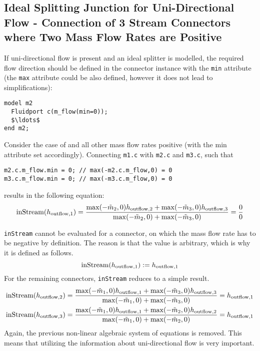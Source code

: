 \subsection{Ideal Splitting Junction for Uni-Directional Flow - Connection of 3 Stream Connectors where Two Mass Flow Rates are Positive}\label{connection-of-3-stream-connectors-where-two-mass-flow-rates-are-positive-ideal-splitting-junction-for-uni-directional-flow}\label{ideal-splitting-junction-for-uni-directional-flow-connection-of-3-stream-connectors-where-two-mass-flow-rates-are-positive}

If uni-directional flow is present and an ideal splitter is modelled, the required flow direction should be defined in the connector instance with the \lstinline!min! attribute (the \lstinline!max! attribute could be also defined, however it does not lead to simplifications):
\begin{lstlisting}[language=modelica]
model m2
  Fluidport c(m_flow(min=0));
  $\ldots$
end m2;
\end{lstlisting}

Consider the case of and all other mass flow rates positive (with the min attribute set accordingly).
Connecting \lstinline!m1.c! with \lstinline!m2.c! and \lstinline!m3.c!, such that
\begin{lstlisting}[language=modelica]
m2.c.m_flow.min = 0; // max(-m2.c.m_flow,0) = 0
m3.c.m_flow.min = 0; // max(-m3.c.m_flow,0) = 0
\end{lstlisting}
results in the following equation:
\begin{equation*}
\text{\lstinline!inStream!}(h_{\mathrm{outflow},1})=\frac{\operatorname{max}(-\tilde{m}_2,0)h_{\mathrm{outflow},2}+\operatorname{max}(-\tilde{m}_3,0)h_{\mathrm{outflow},3}}{\operatorname{max}(-\tilde{m}_2,0)+\operatorname{max}(-\tilde{m}_3,0)}=\frac{0}{0}
\end{equation*}

\lstinline!inStream! cannot be evaluated for a connector, on which the mass flow rate has to be negative by definition.
The reason is that the value is arbitrary, which is why it is defined as follows.
\begin{equation*}
\text{\lstinline!inStream!}(h_{\mathrm{outflow},1}):=h_{\mathrm{outflow},1}
\end{equation*}
For the remaining connectors, \lstinline!inStream! reduces to a simple result.
\begin{align*}
\text{\lstinline!inStream!}(h_{\mathrm{outflow},2}) &= \frac{\operatorname{max}(-\tilde{m}_1,0)h_{\mathrm{outflow},1}+\operatorname{max}(-\tilde{m}_3,0)h_{\mathrm{outflow},3}}{\operatorname{max}(-\tilde{m}_1,0)+\operatorname{max}(-\tilde{m}_3,0)}
  = h_{\mathrm{outflow},1}\\
\text{\lstinline!inStream!}(h_{\mathrm{outflow},3}) &= \frac{\operatorname{max}(-\tilde{m}_1,0)h_{\mathrm{outflow},1}+\operatorname{max}(-\tilde{m}_2,0)h_{\mathrm{outflow},2}}{\operatorname{max}(-\tilde{m}_1,0)+\operatorname{max}(-\tilde{m}_2,0)}
  = h_{\mathrm{outflow},1}
\end{align*}
Again, the previous non-linear algebraic system of equations is removed.
This means that utilizing the information about uni-directional flow is very important.

